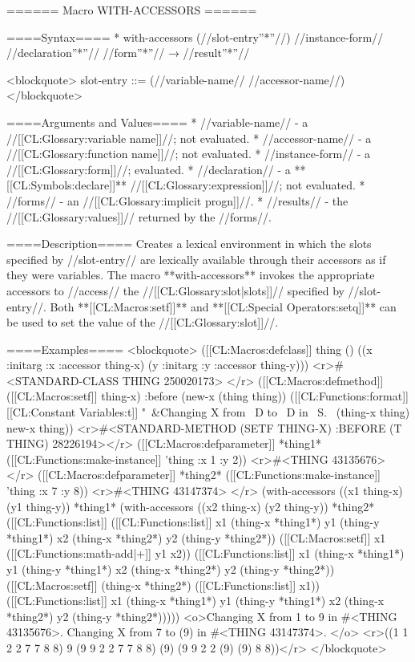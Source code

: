 ====== Macro WITH-ACCESSORS ======

====Syntax====
  * with-accessors (//slot-entry''*''//) //instance-form// //declaration''*''// //form''*''// → //result''*''//

<blockquote>
slot-entry ::= (//variable-name// //accessor-name//)
</blockquote>

====Arguments and Values====
  * //variable-name// - a //[[CL:Glossary:variable name]]//; not evaluated.
  * //accessor-name// - a //[[CL:Glossary:function name]]//; not evaluated.
  * //instance-form// - a //[[CL:Glossary:form]]//; evaluated.
  * //declaration// - a **[[CL:Symbols:declare]]** //[[CL:Glossary:expression]]//; not evaluated.
  * //forms// - an //[[CL:Glossary:implicit progn]]//.
  * //results// - the //[[CL:Glossary:values]]// returned by the //forms//.

====Description====
Creates a lexical environment in which the slots specified by //slot-entry// are lexically available through their accessors as if they were variables. The macro **with-accessors** invokes the appropriate accessors to //access// the //[[CL:Glossary:slot|slots]]// specified by //slot-entry//. Both **[[CL:Macros:setf]]** and **[[CL:Special Operators:setq]]** can be used to set the value of the //[[CL:Glossary:slot]]//.

====Examples====
<blockquote>
([[CL:Macros:defclass]] thing () 
  ((x :initarg :x :accessor thing-x) 
   (y :initarg :y :accessor thing-y))) 
<r>#<STANDARD-CLASS THING 250020173> </r>
([[CL:Macros:defmethod]] ([[CL:Macros:setf]] thing-x) :before (new-x (thing thing)) 
  ([[CL:Functions:format]] [[CL:Constant Variables:t]] "~&Changing X from ~D to ~D in ~S.~%
          (thing-x thing) new-x thing))
<r>#<STANDARD-METHOD (SETF THING-X) :BEFORE (T THING) 28226194></r>
([[CL:Macros:defparameter]] *thing1* ([[CL:Functions:make-instance]] 'thing :x 1 :y 2)) <r>#<THING 43135676> </r>
([[CL:Macros:defparameter]] *thing2* ([[CL:Functions:make-instance]] 'thing :x 7 :y 8)) <r>#<THING 43147374> </r>
(with-accessors ((x1 thing-x) (y1 thing-y)) *thing1* 
  (with-accessors ((x2 thing-x) (y2 thing-y)) *thing2* 
    ([[CL:Functions:list]] ([[CL:Functions:list]] x1 (thing-x *thing1*) y1 (thing-y *thing1*) 
                x2 (thing-x *thing2*) y2 (thing-y *thing2*)) 
          ([[CL:Macros:setf]] x1 ([[CL:Functions:math-add|+]] y1 x2)) 
          ([[CL:Functions:list]] x1 (thing-x *thing1*) y1 (thing-y *thing1*) 
                x2 (thing-x *thing2*) y2 (thing-y *thing2*)) 
          ([[CL:Macros:setf]] (thing-x *thing2*) ([[CL:Functions:list]] x1)) 
          ([[CL:Functions:list]] x1 (thing-x *thing1*) y1 (thing-y *thing1*) 
                x2 (thing-x *thing2*) y2 (thing-y *thing2*)))))
<o>Changing X from 1 to 9 in #<THING 43135676>.
Changing X from 7 to (9) in #<THING 43147374>. </o>
<r>((1 1 2 2 7 7 8 8) 9 (9 9 2 2 7 7 8 8) (9) (9 9 2 2 (9) (9) 8 8))</r>
</blockquote>

